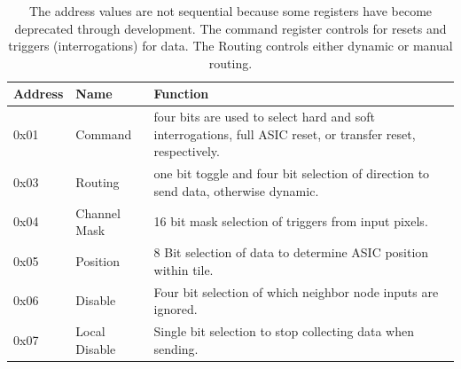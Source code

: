 \begin{table}
\begin{center}
\begin{tabular}{||p{30mm} p{30mm} p{90mm}||}
 \hline
 Address & Name & Function \\ [0.5ex]
 \hline\hline
  0x01 & Command & four bits are used to select hard and soft interrogations, full ASIC reset, or transfer reset, respectively. \\
 \hline
  0x03 & Routing & one bit toggle and four bit selection of direction to send data, otherwise dynamic. \\
 \hline
  0x04 & Channel Mask & 16 bit mask selection of triggers from input pixels. \\
 \hline
  0x05 & Position & 8 Bit selection of data to determine ASIC position within tile. \\
 \hline
  0x06 & Disable & Four bit selection of which neighbor node inputs are ignored. \\
 \hline
  0x07 & Local Disable & Single bit selection to stop collecting data when sending. \\
 \hline
\end{tabular}
\caption{The address values are not sequential because some registers have become deprecated through development.
The command register controls for resets and triggers (interrogations) for data.
The Routing controls either dynamic or manual routing.
}
\label{table:node_registers}
\end{center}
\end{table}

